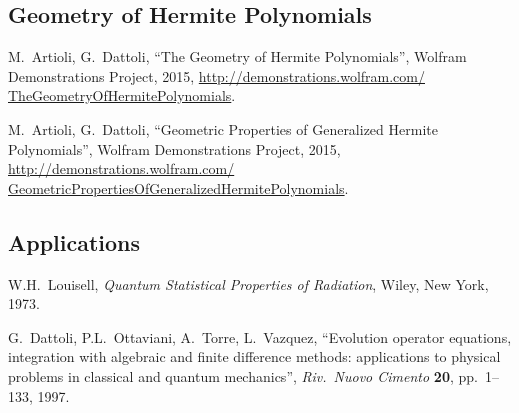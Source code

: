 \subsection*{Geometry of Hermite Polynomials}
\begin{enumerate}[label={[\arabic*]},start=20]
\item M.~Artioli, G.~Dattoli,
      ``The Geometry of Hermite Polynomials'',
      Wolfram Demonstrations Project, 2015,
      \url{http://demonstrations.wolfram.com/
      TheGeometryOfHermitePolynomials}.
\item M.~Artioli, G.~Dattoli,
      ``Geometric Properties of Generalized Hermite
      Polynomials'', Wolfram Demonstrations Project, 2015,
      \url{http://demonstrations.wolfram.com/
      GeometricPropertiesOfGeneralizedHermitePolynomials}.
\end{enumerate}

\subsection*{Applications}
\begin{enumerate}[label={[\arabic*]},start=22]
\item W.H.~Louisell, \emph{Quantum Statistical Properties of
      Radiation}, Wiley, New York, 1973.
\item G.~Dattoli, P.L.~Ottaviani, A.~Torre, L.~Vazquez,
      ``Evolution operator equations, integration with
      algebraic and finite difference methods: applications
      to physical problems in classical and quantum
      mechanics'', \emph{Riv.\ Nuovo Cimento} \textbf{20},
      pp.~1--133, 1997.
\end{enumerate}
